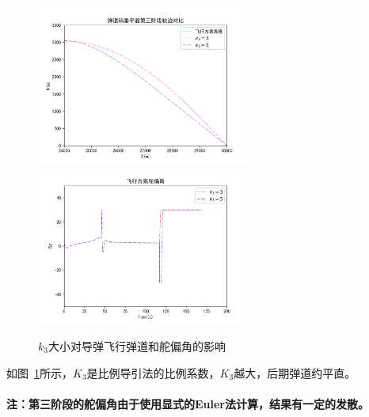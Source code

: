 \documentclass[UTF8]{ctexart}
\begin{document}
\begin{figure}[H]
    \centering
    \includegraphics[width=70mm]{img/飞行轨迹4.png}
    \includegraphics[width=70mm]{img/飞行舵偏角4.png}
    \caption{$k_3$大小对导弹飞行弹道和舵偏角的影响}\label{fig:k3}
\end{figure}
如图~\ref{fig:k3}所示，$K_{3}$是比例导引法的比例系数，$K_3$越大，后期弹道约平直。
~\\
~\\

\bf 注：第三阶段的舵偏角由于使用显式的Euler法计算，结果有一定的发散。
\clearpage




\clearpage

\end{document}
